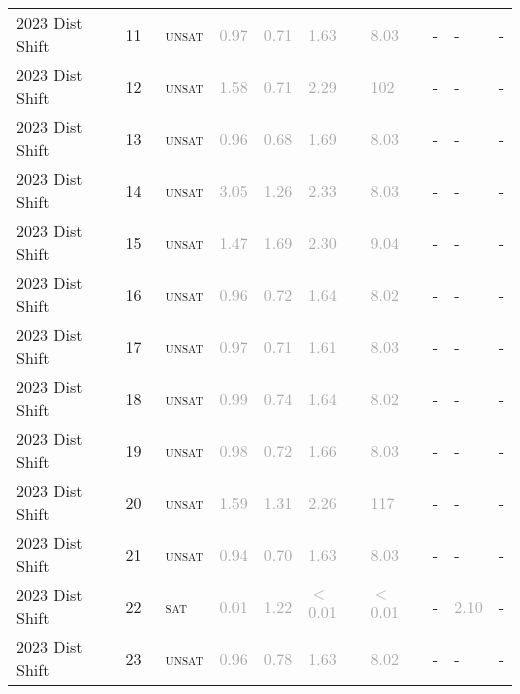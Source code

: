 \begin{center}
{\begin{longtable}{@{}llllllllll@{}}
2023 Dist Shift & 11 & ~\textsc{unsat} & \textcolor{darkgray}{0.97} & \textcolor{darkgray}{0.71} & \textcolor{darkgray}{1.63} & \textcolor{darkgray}{8.03} & - & - & - \\
2023 Dist Shift & 12 & ~\textsc{unsat} & \textcolor{darkgray}{1.58} & \textcolor{darkgray}{0.71} & \textcolor{darkgray}{2.29} & \textcolor{darkgray}{102} & - & - & - \\
2023 Dist Shift & 13 & ~\textsc{unsat} & \textcolor{darkgray}{0.96} & \textcolor{darkgray}{0.68} & \textcolor{darkgray}{1.69} & \textcolor{darkgray}{8.03} & - & - & - \\
2023 Dist Shift & 14 & ~\textsc{unsat} & \textcolor{darkgray}{3.05} & \textcolor{darkgray}{1.26} & \textcolor{darkgray}{2.33} & \textcolor{darkgray}{8.03} & - & - & - \\
2023 Dist Shift & 15 & ~\textsc{unsat} & \textcolor{darkgray}{1.47} & \textcolor{darkgray}{1.69} & \textcolor{darkgray}{2.30} & \textcolor{darkgray}{9.04} & - & - & - \\
2023 Dist Shift & 16 & ~\textsc{unsat} & \textcolor{darkgray}{0.96} & \textcolor{darkgray}{0.72} & \textcolor{darkgray}{1.64} & \textcolor{darkgray}{8.02} & - & - & - \\
2023 Dist Shift & 17 & ~\textsc{unsat} & \textcolor{darkgray}{0.97} & \textcolor{darkgray}{0.71} & \textcolor{darkgray}{1.61} & \textcolor{darkgray}{8.03} & - & - & - \\
2023 Dist Shift & 18 & ~\textsc{unsat} & \textcolor{darkgray}{0.99} & \textcolor{darkgray}{0.74} & \textcolor{darkgray}{1.64} & \textcolor{darkgray}{8.02} & - & - & - \\
2023 Dist Shift & 19 & ~\textsc{unsat} & \textcolor{darkgray}{0.98} & \textcolor{darkgray}{0.72} & \textcolor{darkgray}{1.66} & \textcolor{darkgray}{8.03} & - & - & - \\
2023 Dist Shift & 20 & ~\textsc{unsat} & \textcolor{darkgray}{1.59} & \textcolor{darkgray}{1.31} & \textcolor{darkgray}{2.26} & \textcolor{darkgray}{117} & - & - & - \\
2023 Dist Shift & 21 & ~\textsc{unsat} & \textcolor{darkgray}{0.94} & \textcolor{darkgray}{0.70} & \textcolor{darkgray}{1.63} & \textcolor{darkgray}{8.03} & - & - & - \\
2023 Dist Shift & 22 & ~\textsc{sat} & \textcolor{darkgray}{0.01} & \textcolor{darkgray}{1.22} & \textcolor{darkgray}{$<$0.01} & \textcolor{darkgray}{$<$0.01} & - & \textcolor{darkgray}{2.10} & - \\
2023 Dist Shift & 23 & ~\textsc{unsat} & \textcolor{darkgray}{0.96} & \textcolor{darkgray}{0.78} & \textcolor{darkgray}{1.63} & \textcolor{darkgray}{8.02} & - & - & - \\

\end{longtable}}
\end{center}
